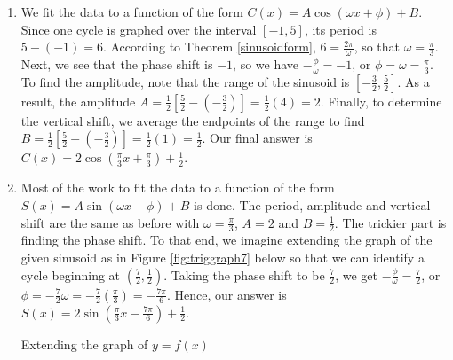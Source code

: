 {\begin{enumerate}

\item We fit the data to a function of the form $C(x) = A \cos(\omega x + \phi) + B$.  Since one cycle is graphed over the interval $[-1,5]$, its period is $5-(-1) = 6$.  According to Theorem \ref{sinusoidform}, $6 = \frac{2\pi}{\omega}$, so that $\omega = \frac{\pi}{3}$.  Next, we see that the phase shift is $-1$, so we have $-\frac{\phi}{\omega} = -1$, or $\phi = \omega = \frac{\pi}{3}$.  To find the amplitude, note that the range of the sinusoid is $\left[ -\frac{3}{2}, \frac{5}{2}\right]$.  As a result, the amplitude $A = \frac{1}{2}\left[ \frac{5}{2} - \left(-\frac{3}{2}\right)\right] = \frac{1}{2} (4) = 2.$  Finally, to determine the vertical shift, we average the endpoints of the range to find $B = \frac{1}{2}\left[ \frac{5}{2} + \left(-\frac{3}{2}\right)\right] = \frac{1}{2}(1) = \frac{1}{2}$.  Our final answer is $C(x) = 2 \cos\left(\frac{\pi}{3} x + \frac{\pi}{3} \right) + \frac{1}{2}$. 

\item  Most of the work to fit the data to a function of the form $S(x) = A \sin(\omega x + \phi) + B$ is done.  The period, amplitude and vertical shift are the same as before with $\omega = \frac{\pi}{3}$, $A = 2$ and $B = \frac{1}{2}$.  The trickier part is finding the phase shift.  To that end, we imagine extending the graph of the given sinusoid as in Figure \ref{fig:triggraph7} below so that we can identify a cycle beginning at $\left(\frac{7}{2}, \frac{1}{2}\right)$.  Taking the phase shift to be $\frac{7}{2}$, we get $-\frac{\phi}{\omega} = \frac{7}{2}$, or $\phi = -\frac{7}{2} \omega = -\frac{7}{2}\left(\frac{\pi}{3}\right) = -\frac{7\pi}{6}$.  Hence, our answer is $S(x) = 2 \sin\left(\frac{\pi}{3} x - \frac{7\pi}{6}\right) + \frac{1}{2}$. 

\medskip

\noindent\hskip-10pt\begin{minipage}{\textwidth}
\begin{center}
\end{center} 
\captionsetup{type=figure}
\caption{Extending the graph of $y=f(x)$}\label{fig:triggraph7}
\end{minipage}

\end{enumerate}
}

\medskip

